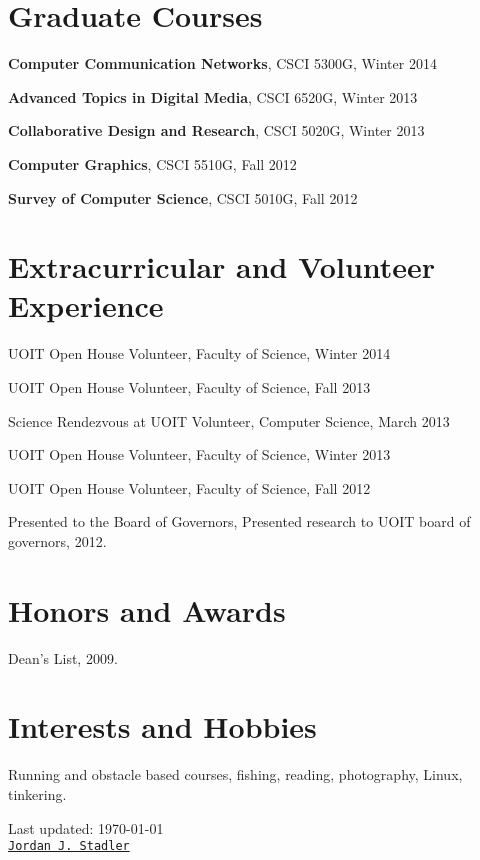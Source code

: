 \documentclass[letterpaper]{article}
\def\footerlink{Jordan J. Stadler}
\renewenvironment{itemize}{
  \begin{list}{}{
    \setlength{\leftmargin}{1.5em}
  }
}{
  \end{list}
}
\begin{document}
\section*{Graduate Courses}
\begin{itemize}
\item\textbf{Computer Communication Networks}, CSCI 5300G, Winter 2014
\item\textbf{Advanced Topics in Digital Media}, CSCI 6520G, Winter 2013
\item\textbf{Collaborative Design and Research}, CSCI 5020G, Winter 2013
\item\textbf{Computer Graphics}, CSCI 5510G, Fall 2012
\item\textbf{Survey of Computer Science}, CSCI 5010G, Fall 2012
\end{itemize}


\section*{Extracurricular and Volunteer Experience}
\begin{itemize}
\item UOIT Open House Volunteer, Faculty of Science, Winter 2014
\item UOIT Open House Volunteer, Faculty of Science, Fall 2013
\item Science Rendezvous at UOIT Volunteer, Computer Science, March 2013
\item UOIT Open House Volunteer, Faculty of Science, Winter 2013
\item UOIT Open House Volunteer, Faculty of Science, Fall 2012
\item Presented to the Board of Governors, Presented research to UOIT board of governors, 2012.
\end{itemize}


\section*{Honors and Awards}
\begin{itemize}
\item Dean's List, 2009.
\end{itemize}


\section*{Interests and Hobbies}
\begin{itemize}
\item Running and obstacle based courses, fishing, reading, photography, Linux, tinkering.
\item 
\end{itemize}


\bigskip

\begin{center}
  \begin{footnotesize}
    Last updated: \today \\
    \href{\footerlink}{\texttt{\footerlink}}
  \end{footnotesize}
\end{center}
\end{document}
